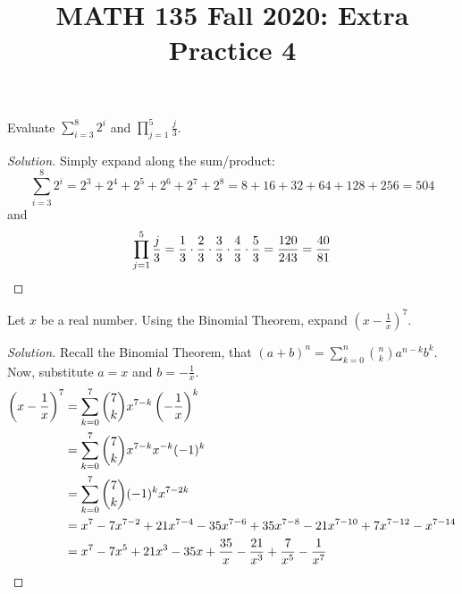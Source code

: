 \documentclass{agony}
\title{MATH 135 Fall 2020: Extra Practice 4}
\begin{document}
\thispagestyle{firstpage}

\textbf{\thetitle}


\question Evaluate $\displaystyle\sum^8_{i=3}2^i$ and $\displaystyle\prod^5_{j=1}\frac{j}{3}$.
\begin{proof}[Solution]
  Simply expand along the sum/product:
  \[ \sum^8_{i=3}2^i = 2^3 + 2^4 + 2^5 + 2^6 + 2^7 + 2^8 = 8+16+32+64+128+256 = 504 \]
  and
  \begin{equation*}
    \prod^5_{j=1}\frac{j}{3}
    = \frac13\cdot\frac23\cdot\frac33\cdot\frac43\cdot\frac53
    = \frac{120}{243}
    = \frac{40}{81} \qedhere
  \end{equation*}
\end{proof}


\question Let $x$ be a real number.
Using the Binomial Theorem, expand $\left(x-\frac{1}{x}\right)^7$.
\begin{proof}[Solution]
  Recall the Binomial Theorem, that $(a+b)^n = \sum_{k=0}^n\binom{n}{k}a^{n-k}b^k$.
  Now, substitute $a = x$ and $b = -\frac{1}{x}$.
  \begin{align*}
    \left(x-\frac{1}{x}\right)^7
     & = \sum_{k=0}^7\binom{7}{k}x^{7-k}\left(-\frac{1}{x}\right)^k                          \\
     & = \sum_{k=0}^7\binom{7}{k}x^{7-k}x^{-k}(-1)^k                                         \\
     & = \sum_{k=0}^7\binom{7}{k}(-1)^k x^{7-2k}                                             \\
     & = x^7-7x^{7-2}+21x^{7-4}-35x^{7-6}+35x^{7-8}-21x^{7-10}+7x^{7-12}-x^{7-14}            \\
     & = x^7-7x^5+21x^3-35x+\frac{35}{x}-\frac{21}{x^3}+\frac{7}{x^5}-\frac{1}{x^7} \qedhere
  \end{align*}
\end{proof}


\end{document}
